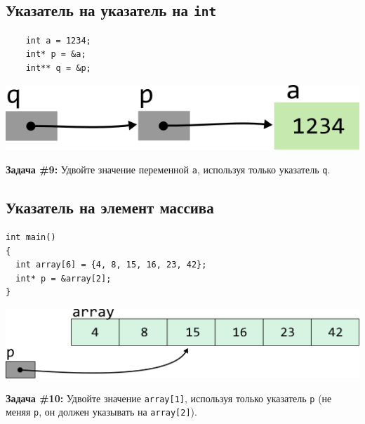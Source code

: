 \documentclass{article}
\begin{document}
\subsection*{Указатель на указатель на \texttt{int}}

\begin{multicols}{2}
\begin{lstlisting}
	int a = 1234;
	int* p = &a;
	int** q = &p;
\end{lstlisting}
\columnbreak
\begin{center}
\includegraphics[scale=1]{../../images/pointer_schemes/pointer_to_pointer_to_int.png}
\end{center}
\end{multicols}
\textbf{Задача \#9:} Удвойте значение переменной \texttt{a}, используя только указатель \texttt{q}.

\newpage
\subsection*{Указатель на элемент массива}
\begin{multicols}{2}
\begin{lstlisting}
int main()
{
  int array[6] = {4, 8, 15, 16, 23, 42};
  int* p = &array[2];
}
\end{lstlisting}
\columnbreak
\begin{center}
\includegraphics[scale=0.75]{../../images/pointer_schemes/pointer_to_array_of_ints.png}
\end{center}
\end{multicols}

\textbf{Задача \#10:} Удвойте значение \texttt{array[1]}, используя только указатель \texttt{p} (не меняя \texttt{p}, он должен указывать на \texttt{array[2]}).
\end{document}
